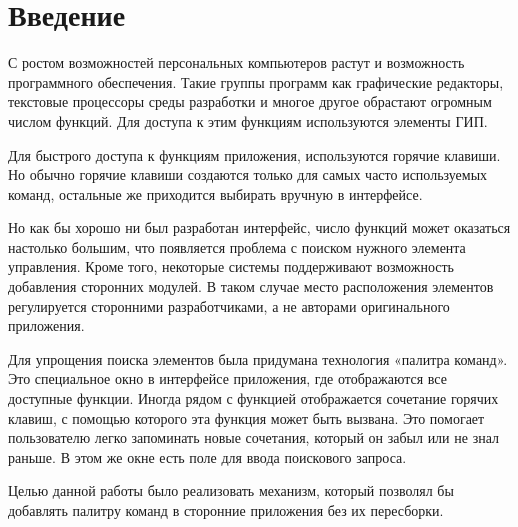 \chapter*{Введение}

С ростом возможностей персональных компьютеров растут и возможность программного
обеспечения. Такие группы программ как графические редакторы, текстовые
процессоры среды разработки и многое другое обрастают огромным числом функций.
Для доступа к этим функциям используются элементы ГИП.

Для быстрого доступа к функциям приложения, используются горячие клавиши. Но
обычно горячие клавиши создаются только для самых часто используемых команд,
остальные же приходится выбирать вручную в интерфейсе.

Но как бы хорошо ни был разработан интерфейс, число функций может оказаться
настолько большим, что появляется проблема с поиском нужного элемента
управления. Кроме того, некоторые системы поддерживают возможность добавления
сторонних модулей. В таком случае место расположения элементов регулируется
сторонними разработчиками, а не авторами оригинального приложения.

Для упрощения поиска элементов была придумана технология «палитра команд». Это
специальное окно в интерфейсе приложения, где отображаются все доступные
функции.
Иногда рядом с функцией отображается сочетание горячих клавиш, с помощью
которого эта функция может быть вызвана. Это помогает пользователю легко
запоминать новые сочетания, который он забыл или не знал раньше.
В этом же окне есть поле для ввода поискового запроса.

Целью данной работы было реализовать механизм, который позволял бы добавлять
палитру команд в сторонние приложения без их пересборки.
